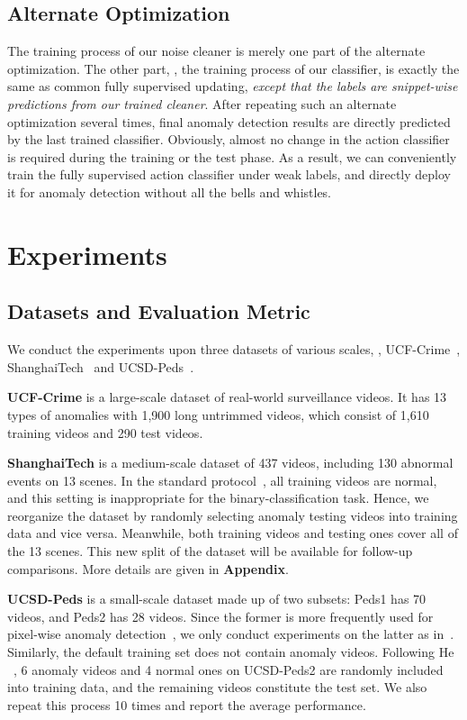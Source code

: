 \documentclass[10pt,twocolumn,letterpaper]{article}
\begin{document}
\subsection{Alternate Optimization}
The training process of our noise cleaner is merely one part of the alternate optimization. The other part, \ie, the training process of our classifier, is exactly the same as common fully supervised updating, \emph{except that the labels are snippet-wise predictions from our trained cleaner}. After repeating such an alternate optimization several times, final anomaly detection results are directly predicted by the last trained classifier. Obviously, almost no change in the action classifier is required during the training or the test phase. As a result, we can conveniently train the fully supervised action classifier under weak labels, and directly deploy it for anomaly detection without all the bells and whistles.

\section{Experiments}\label{sec_experiment}

\subsection{Datasets and Evaluation Metric}
We conduct the experiments upon three datasets of various scales, \ie, {UCF-Crime}~\cite{Sultani_2018_CVPR}, {ShanghaiTech}~\cite{Luo_2017_ICCV} and {UCSD-Peds}~\cite{li2014crowded}. 

\textbf{{UCF-Crime}} is a large-scale dataset of real-world surveillance videos. It has 13 types of anomalies with 1,900 long untrimmed videos, which consist of 1,610 training videos and 290 test videos.

\textbf{{ShanghaiTech}} is a medium-scale dataset of 437 videos, including 130 abnormal events on 13 scenes. In the standard protocol~\cite{Luo_2017_ICCV}, all training videos are normal, and this setting is inappropriate for the binary-classification task. Hence, we reorganize the dataset by randomly selecting anomaly testing videos into training data and vice versa. Meanwhile, both training videos and testing ones cover all of the 13 scenes. This new split of the dataset will be available for follow-up comparisons. More details are given in \textbf{Appendix}.

\textbf{{UCSD-Peds}} is a small-scale dataset made up of two subsets: Peds1 has 70 videos, and Peds2 has 28 videos. Since the former is more frequently used for pixel-wise anomaly detection~\cite{xu2015deep}, we only conduct experiments on the latter as in~\cite{Luo_2017_ICCV}. Similarly, the default training set does not contain anomaly videos. Following He \etal~\cite{he2017anomaly}, 6 anomaly videos and 4 normal ones on UCSD-Peds2 are randomly included into training data, and the remaining videos constitute the test set. We also repeat this process 10 times and report the average performance.
\end{document}
